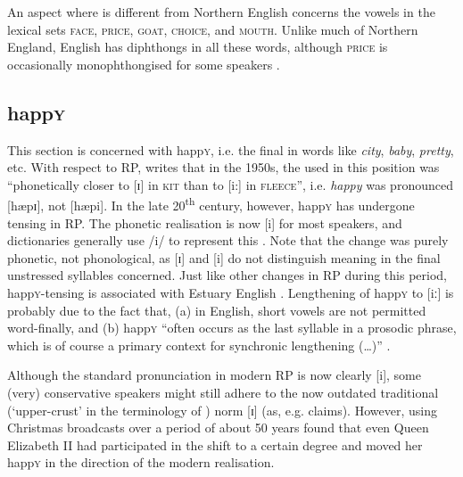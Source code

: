 An aspect where  is different from Northern English concerns the vowels in the lexical sets \textsc{face}, \textsc{price}, \textsc{goat}, \textsc{choice}, and \textsc{mouth}.
Unlike much of Northern England,  English has diphthongs in all these words, although \textsc{price} is occasionally monophthongised for some speakers \citep[cf.][358]{watson2007}.

		\subsection{happ\textsc{y}}\label{sec.var.vow.happy}

This section is concerned with happ\textsc{y}, i.e. the final  in words like \emph{city}, \emph{baby}, \emph{pretty}, etc.
With respect to RP, \citet[441]{harrington2006} writes that in the 1950s, the  used in this position was ``phonetically closer to [ɪ] in \textsc{kit} than to [i:] in \textsc{fleece}'', i.e. \emph{happy} was pronounced [hæpɪ], not [hæpi].
In the late 20\textsuperscript{th} century, however, happ\textsc{y} has undergone tensing in RP.
The phonetic realisation is now [i] for most speakers, and dictionaries generally use /i/ to represent this .
Note that the change was purely phonetic, not phonological, as [ɪ] and [i] do not distinguish meaning in the final unstressed syllables concerned.
Just like other changes in RP during this period, happ\textsc{y}-tensing is associated with Estuary English \citep[cf.][]{wells1997}.
Lengthening of happ\textsc{y} to [iː] is probably due to the fact that, (a) in English, short vowels are not permitted word-finally, and (b) happ\textsc{y} ``often occurs as the last syllable in a prosodic phrase, which is of course a primary context for synchronic lengthening (\ldots)'' \citep[441]{harrington2006}.

Although the standard pronunciation in modern RP is now clearly [i], some (very) conservative speakers might still adhere to the now outdated traditional (`upper-crust' in the terminology of \citealt{wells1982}) norm [ɪ] (as, e.g. \cite{trudgill1999} claims).
However, using Christmas broadcasts over a period of about 50 years \citet[cf.][452]{harrington2006} found that even Queen Elizabeth II had participated in the shift to a certain degree and moved her happ\textsc{y}  in the direction of the modern realisation.

